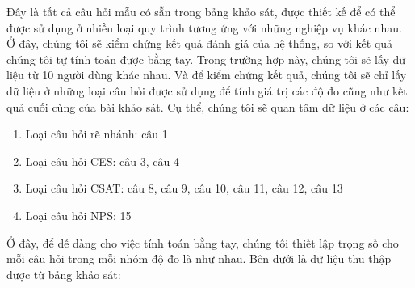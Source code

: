 Đây là tất cả câu hỏi mẫu có sẵn trong bảng khảo sát, được thiết kế để có thể được sử dụng ở nhiều loại quy trình tương ứng với những nghiệp vụ khác nhau. 
Ở đây, chúng tôi sẽ kiểm chứng kết quả đánh giá của hệ thống, so với kết quả chúng tôi tự tính toán được bằng tay. Trong trường hợp này, 
chúng tôi sẽ lấy dữ liệu từ 10 người dùng khác nhau. Và để kiểm chứng kết quả, chúng tôi sẽ chỉ lấy dữ liệu ở những loại câu hỏi được sử dụng để 
tính giá trị các độ đo cũng như kết quả cuối cùng của bài khảo sát. Cụ thể, chúng tôi sẽ quan tâm dữ liệu ở các câu:
\begin{enumerate}
    \item Loại câu hỏi rẽ nhánh: câu 1
    \item Loại câu hỏi CES: câu 3, câu 4
    \item Loại câu hỏi CSAT: câu 8, câu 9, câu 10, câu 11, câu 12, câu 13
    \item Loại câu hỏi NPS: 15
\end{enumerate}

Ở đây, để dễ dàng cho việc tính toán bằng tay, chúng tôi thiết lập trọng số cho mỗi câu hỏi trong mỗi nhóm độ đo là như nhau. Bên dưới là dữ liệu thu thập được từ bảng khảo sát:

